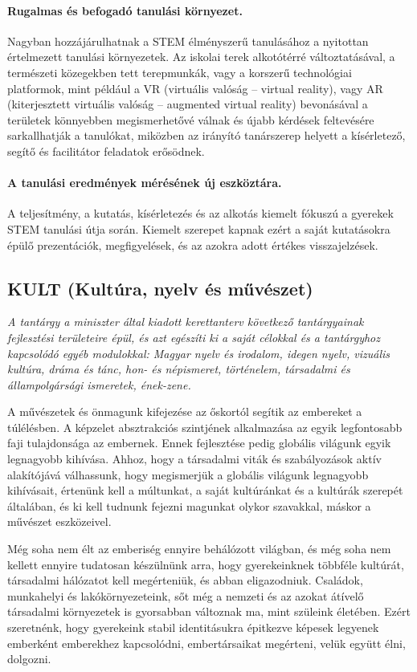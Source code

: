 \paragraph{Rugalmas és befogadó tanulási környezet.} Nagyban hozzájárulhatnak a STEM élményszerű tanulásához a nyitottan értelmezett tanulási környezetek. Az iskolai terek alkotótérré változtatásával, a természeti közegekben tett terepmunkák, vagy a korszerű technológiai platformok, mint például a VR (virtuális valóság – virtual reality), vagy AR (kiterjesztett virtuális valóság – augmented virtual reality) bevonásával a területek könnyebben megismerhetővé válnak és újabb kérdések feltevésére sarkallhatják a tanulókat, miközben az irányító tanárszerep helyett a kísérletező, segítő és facilitátor feladatok erősödnek.


\paragraph{A tanulási eredmények mérésének új eszköztára.} A teljesítmény, a kutatás, kísérletezés és az alkotás kiemelt fókuszú a gyerekek STEM tanulási útja során. Kiemelt szerepet kapnak ezért a saját kutatásokra épülő prezentációk, megfigyelések, és az azokra adott értékes visszajelzések.

\subsection[KULT]{KULT (Kultúra, nyelv és művészet)}
\emph{A tantárgy a miniszter által kiadott kerettanterv következő tantárgyainak fejlesztési területeire épül, és azt egészíti ki a saját célokkal és a tantárgyhoz kapcsolódó egyéb modulokkal: Magyar nyelv és irodalom, idegen nyelv, vizuális kultúra, dráma és tánc, hon- és népismeret, történelem, társadalmi és állampolgársági ismeretek, ének-zene.}

A művészetek és önmagunk kifejezése az őskortól segítik az embereket a túlélésben. A képzelet absztrakciós szintjének alkalmazása az egyik legfontosabb faji tulajdonsága az embernek. Ennek fejlesztése pedig globális világunk egyik legnagyobb kihívása. Ahhoz, hogy a társadalmi viták és szabályozások aktív alakítójává válhassunk, hogy megismerjük a globális világunk legnagyobb kihívásait, értenünk kell a múltunkat, a saját kultúránkat és a kultúrák szerepét általában, és ki kell tudnunk fejezni magunkat olykor szavakkal, máskor a művészet eszközeivel.

Még soha nem élt az emberiség ennyire behálózott világban, és még soha nem kellett ennyire tudatosan készülnünk arra, hogy gyerekeinknek többféle kultúrát, társadalmi hálózatot kell megérteniük, és abban eligazodniuk. Családok, munkahelyi és lakókörnyezeteink, sőt még a nemzeti és az azokat átívelő társadalmi környezetek is gyorsabban változnak ma, mint szüleink életében. Ezért szeretnénk, hogy gyerekeink stabil identitásukra épitkezve képesek legyenek emberként emberekhez kapcsolódni, embertársaikat megérteni, velük együtt élni, dolgozni.

